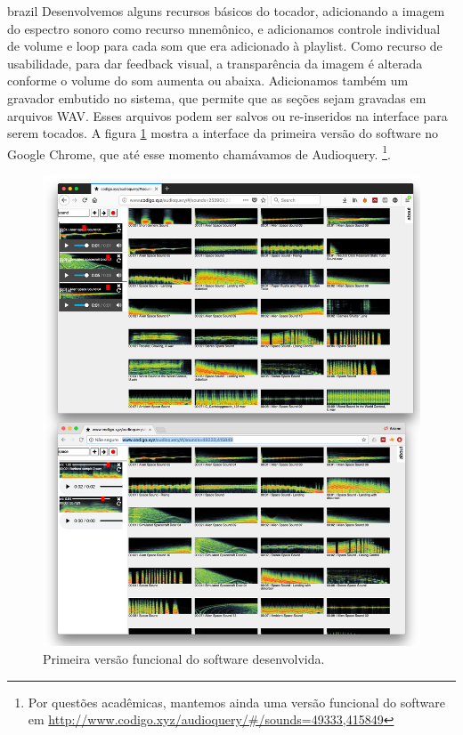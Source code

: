 \begin{otherlanguage*}{brazil}
 Desenvolvemos alguns recursos básicos do tocador, adicionando a imagem do espectro sonoro como recurso mnemônico, e adicionamos controle individual de volume e loop para cada som que era adicionado à playlist. Como recurso de usabilidade, para dar feedback visual, a transparência da imagem é alterada conforme o volume do som aumenta ou abaixa. Adicionamos também um gravador embutido no sistema, que permite que as seções sejam gravadas em arquivos WAV. Esses arquivos podem ser salvos ou re-inseridos na interface para serem tocados. A figura \ref{fig:audioquery} mostra a interface da primeira versão do software no Google Chrome, que até esse momento chamávamos de Audioquery. \footnote{Por questões acadêmicas, mantemos ainda uma versão funcional do software em \url{http://www.codigo.xyz/audioquery/\#/sounds=49333,415849}}.

\begin{figure}
\centering
\includegraphics[width=1\textwidth]{pictures/cap4/audioquery_browsers}
\caption{\label{audiquery}Primeira versão funcional do software desenvolvida.}
\label{fig:audioquery}
\end{figure}


\end{otherlanguage*}
